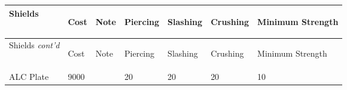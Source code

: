 \documentclass[twoside]{book}
\begin{document}
\begin{longtable}{p{1.25in}llp{3em}p{3em}p{3em}p{3em}} 
  Shields
  &
  \begin{turn}{70}{Cost}\end{turn}
          
  &
  \begin{turn}{70}{Note}\end{turn}
          
  &
  \begin{turn}{70}{Piercing}\end{turn}
          
  &
  \begin{turn}{70}{Slashing}\end{turn}
          
  &
  \begin{turn}{70}{Crushing}\end{turn}
          
  &
  \begin{turn}{70}{Minimum Strength}\end{turn}
          
  \\
  \hline
  \hline
  \endfirsthead
  Shields \textit{cont'd}
        
  &
  \begin{turn}{70}{Cost}\end{turn}
          
  &
  \begin{turn}{70}{Note}\end{turn}
          
  &
  \begin{turn}{70}{Piercing}\end{turn}
          
  &
  \begin{turn}{70}{Slashing}\end{turn}
          
  &
  \begin{turn}{70}{Crushing}\end{turn}
          
  &
  \begin{turn}{70}{Minimum Strength}\end{turn}
          
  \\
  \hline
  \endhead
      
  \raggedright
           ALC Plate 
  &
   9000 
  &
  
  &
   20 
  &
   20 
  &
   20 
  &
   10 
  \tabularnewline
      

\end{longtable}
\end{document}
